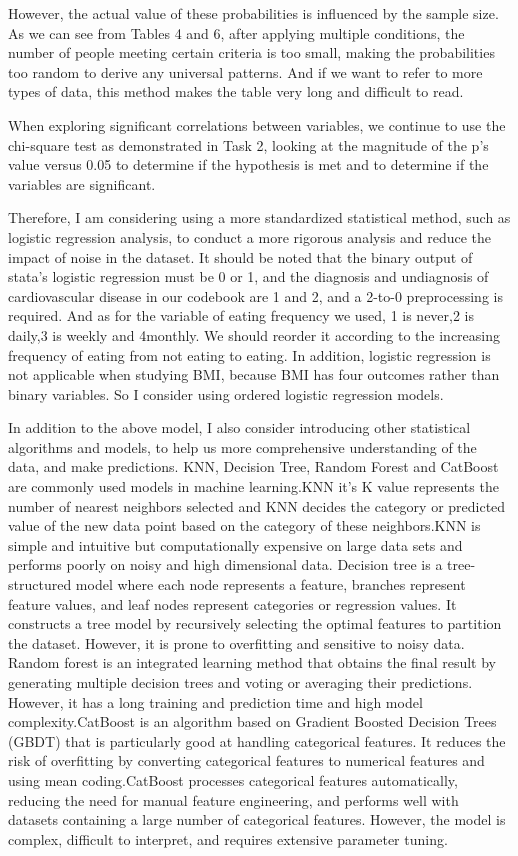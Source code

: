 \documentclass{article}
\begin{document}
However, the actual value of these probabilities is influenced by the sample size. As we can see from Tables 4 and 6, after applying multiple conditions, the number of people meeting certain criteria is too small, making the probabilities too random to derive any universal patterns. And if we want to refer to more types of data, this method makes the table very long and difficult to read.

When exploring significant correlations between variables, we continue to use the chi-square test as demonstrated in Task 2, looking at the magnitude of the p's value versus 0.05 to determine if the hypothesis is met and to determine if the variables are significant.

Therefore, I am considering using a more standardized statistical method, such as logistic regression analysis, to conduct a more rigorous analysis and reduce the impact of noise in the dataset. It should be noted that the binary output of stata's logistic regression must be 0 or 1, and the diagnosis and undiagnosis of cardiovascular disease in our codebook are 1 and 2, and a 2-to-0 preprocessing is required. And as for the variable of eating frequency we used, 1 is never,2 is daily,3 is weekly and 4monthly. We should reorder it according to the increasing frequency of eating from not eating to eating. In addition, logistic regression is not applicable when studying BMI, because BMI has four outcomes rather than binary variables. So I consider using ordered logistic regression models.

In addition to the above model, I also consider introducing other statistical algorithms and models, to help us more comprehensive understanding of the data, and make predictions. KNN, Decision Tree, Random Forest and CatBoost are commonly used models in machine learning.KNN it's K value represents the number of nearest neighbors selected and KNN decides the category or predicted value of the new data point based on the category of these neighbors.KNN is simple and intuitive but computationally expensive on large data sets and performs poorly on noisy and high dimensional data. Decision tree is a tree-structured model where each node represents a feature, branches represent feature values, and leaf nodes represent categories or regression values. It constructs a tree model by recursively selecting the optimal features to partition the dataset. However, it is prone to overfitting and sensitive to noisy data. Random forest is an integrated learning method that obtains the final result by generating multiple decision trees and voting or averaging their predictions. However, it has a long training and prediction time and high model complexity.CatBoost is an algorithm based on Gradient Boosted Decision Trees (GBDT) that is particularly good at handling categorical features. It reduces the risk of overfitting by converting categorical features to numerical features and using mean coding.CatBoost processes categorical features automatically, reducing the need for manual feature engineering, and performs well with datasets containing a large number of categorical features. However, the model is complex, difficult to interpret, and requires extensive parameter tuning.
\end{document}
